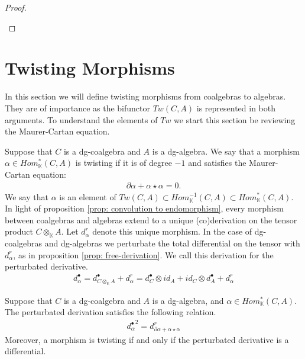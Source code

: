 \documentclass[../thesis.tex]{subfiles}
\begin{document}
\begin{proof}
\begin{center}
                \end{center}

            \end{proof}

    \section{Twisting Morphisms}

            In this section we will define twisting morphisms from coalgebras to algebras. They are of importance as the bifunctor $Tw(C,A)$ is represented in both arguments. To understand the elements of $Tw$ we start this section be reviewing the Maurer-Cartan equation.

            Suppose that $C$ is a dg-coalgebra and $A$ is a dg-algebra. We say that a morphism $\alpha\in Hom_\mathbb{K}^*(C,A)$ is twisting if it is of degree $-1$ and satisfies the Maurer-Cartan equation:
            \begin{align*}
                \partial\alpha + \alpha\star\alpha = 0\text{.}
            \end{align*}
            We say that $\alpha$ is an element of $Tw(C,A)\subset Hom_\mathbb{K}^{-1}(C,A)\subset Hom_\mathbb{K}^*(C,A)$. In light of proposition \ref{prop: convolution to endomorphism}, every morphism between coalgebras and algebras extend to a unique (co)derivation on the tensor product $C\otimes_\mathbb{K}A$. Let $d_\alpha^r$ denote this unique morphism. In the case of dg-coalgebras and dg-algebras we perturbate the total differential on the tensor with $d_\alpha^r$, as in proposition \ref{prop: free-derivation}. We call this derivation for the perturbated derivative.
            \begin{align*}
                d_\alpha^\bullet = d_{C\otimes_\mathbb{K}A}^\bullet + d_\alpha^r = d_C^\bullet\otimes id_A + id_C\otimes d_A^\bullet + d_\alpha^r
            \end{align*}
            \begin{proposition}\label{prop: twisted-differential}
                Suppose that $C$ is a dg-coalgebra and $A$ is a dg-algebra, and $\alpha\in Hom_\mathbb{K}^*(C,A)$. The perturbated derivation satisfies the following relation.
                \begin{align*}
                    {d^\bullet_\alpha}^2 = d^r_{\partial \alpha + \alpha\star\alpha}
                \end{align*}
                Moreover, a morphism is twisting if and only if the perturbated derivative is a differential.
            \end{proposition}
\end{document}
